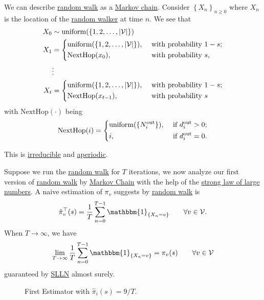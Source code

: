 We can describe \hyperref[algo:random-walk-algorithm]{random walk} as a \hyperref[def:Markov-chain]{Markov chain}. Consider \(\left\{ X_n \right\}_{n\geq 0}\) where \(X_n\) is the location of the \hyperref[def:random-walker]{random walker} at time \(n\). We see that
\[
	\begin{split}
		X_0 &\sim \mathrm{uniform}(\{1, 2, \ldots , \left\vert \mathcal{\MakeUppercase{V}} \right\vert\})\\
		X_1 &=\begin{dcases}
			\mathrm{uniform}(\{1, 2, \ldots , \left\vert \mathcal{\MakeUppercase{V}} \right\vert \}), & \text{ with probability }1 - s; \\
			\mathrm{NextHop}(x_0),                                                                    & \text{ with probability }s,     \\
		\end{dcases}\\
		&\vdots\\
		X_t &=\begin{dcases}
			\mathrm{uniform}(\{1, 2, \ldots , \left\vert \mathcal{\MakeUppercase{V}} \right\vert\}), & \text{ with probability }1 - s; \\
			\mathrm{NextHop}(x_{t-1}),                                                               & \text{ with probability }s      \\
		\end{dcases}
	\end{split}
\]
with \(\mathrm{NextHop}(\cdot)\) being
\[
	\mathrm{NextHop}(i)=\begin{dcases}
		\mathrm{uniform}(\{N^{\text{out}}_i\}), & \text{ if }d^{\text{out}}_i > 0; \\
		i,                                      & \text{ if }d^{\text{out}}_i = 0.
	\end{dcases}
\]
\begin{note}
	This is \hyperref[def:irreducible]{irreducible} and \hyperref[def:aperiodic]{aperiodic}.
\end{note}

Suppose we run the \hyperref[algo:random-walk-algorithm]{random walk} for \(T\) iterations, we now analyze our first version of \hyperref[algo:random-walk-algorithm]{random walk} by \hyperref[def:Markov-chain]{Markov Chain} with the help of the \hyperref[thm:SLLN]{strong law of large numbers}. A naive estimation of \(\pi_v \) suggests by \hyperref[algo:random-walk-algorithm]{random walk} is
\[
	\hat{\pi}^{\top}_{v}(s)
	= \frac{1}{T}\sum\limits_{n=0}^{T-1} \mathbbm{1}_{\{X_n = v\}}\qquad \forall v\in \mathcal{V}.
\]
When \(T\to \infty \), we have
\[
	\lim_{T\to \infty}\frac{1}{T} \sum\limits_{n=0}^{T-1} \mathbbm{1}_{\{X_n = v\}} = \pi_v(s) \qquad \forall v\in \mathcal{V}
\]
guaranteed by \hyperref[thm:SLLN]{SLLN} almost surely.
\begin{figure}[H]
	\centering
	\caption{First Estimator with \(\hat{\pi}_i(s) = 9/T\).}
	\label{fig:Monte-Carlo-Estimator-1}
\end{figure}

